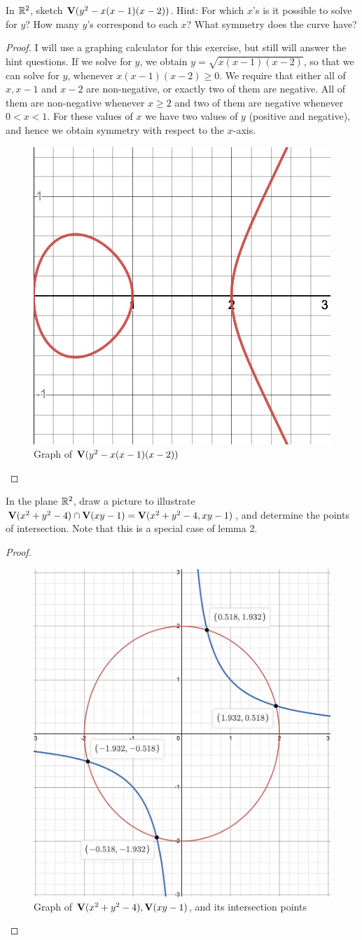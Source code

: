 \begin{exercise}{2}
In $\mathbb{R}^2$, sketch $\mathbf{V}(y^2-x(x-1)(x-2))$. Hint: For which $x$'s is it possible to solve for $y$? How many $y$'s correspond to each $x$? What symmetry does the curve have?
\end{exercise}
\begin{proof}
I will use a graphing calculator for this exercise, but still will answer the hint questions. If we solve for $y$, we obtain $y=\sqrt{x(x-1)(x-2)}$, so that we can solve for $y$, whenever $x(x-1)(x-2)\geq 0$. We require that either all of $x, x-1$ and $x-2$ are non-negative, or exactly two of them are negative. All of them are non-negative whenever $x\geq 2$ and two of them are negative whenever $0<x<1$. For these values of $x$ we have two values of $y$ (positive and negative), and hence we obtain symmetry with respect to the $x$-axis.
 \begin{figure}[H]
     \centering
     \includegraphics[width=.5\textwidth]{cox-little-oshea/assets/sec1-2-ex2.png}
     \caption{Graph of $\mathbf{V}(y^2-x(x-1)(x-2))$}
     \label{fig:sec1-2-ex2}
 \end{figure}
\end{proof}

\begin{exercise}{3}
In the plane $\mathbb{R}^2$, draw a picture to illustrate $\mathbf{V}(x^2+y^2-4)\cap\mathbf{V}(xy-1)=\mathbf{V}(x^2+y^2-4,xy-1)$, and determine the points of intersection. Note that this is a special case of lemma 2.
\end{exercise}
\begin{proof}
 \begin{figure}[H]
     \centering
     \includegraphics[width=.5\textwidth]{cox-little-oshea/assets/sec1-2-ex3.png}
     \caption{Graph of $\mathbf{V}(x^2+y^2-4), \mathbf{V}(xy-1)$, and its intersection points}
     \label{fig:sec1-2-ex3}
 \end{figure}
\end{proof}

